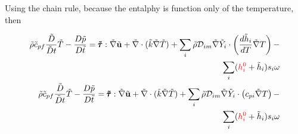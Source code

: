 \documentclass[preprint,12pt,authoryear]{elsarticle}
\begin{document}
Using the chain rule, because the entalphy is function only of the temperature, then 

\begin{equation}
\begin{split}
        \tilde{\rho}
        \tilde{c}_{pf}
        \frac{\tilde{D}}{\tilde{D} t}
        \tilde{T}
        -
        \frac{D \tilde{p}}{D\tilde{t}}
        =
        \pmb{\tilde{\tau}}:\tilde{\nabla} \tilde{\mathbf{u}} 
        + 
        \tilde{\nabla} \cdot (\tilde{k}\tilde{\nabla} \tilde{T})
        +
        \sum\limits_i 
        \tilde{\rho}
        \mathcal{D}_{im}
        \tilde{\nabla}
        \tilde{Y}_i     
        \cdot
        \left(
        \frac{d \tilde{h}_i}{ d T}
        \tilde{\nabla}T 
        \right)
        	-
\\
        \sum\limits_i
        ({\color{red} h_i^0} + \tilde{h}_i)
        s_i	
        \omega
\\
        \tilde{\rho}
        \tilde{c}_{pf}
        \frac{\tilde{D}}{\tilde{D} t}
        \tilde{T}
        -
        \frac{D \tilde{p}}{D\tilde{t}}
        =
        \pmb{\tilde{\tau}}:\tilde{\nabla} \tilde{\mathbf{u}} 
        + 
        \tilde{\nabla} \cdot (\tilde{k}\tilde{\nabla} \tilde{T})
        +
        \sum\limits_i 
        \tilde{\rho}
        \mathcal{D}_{im}
        \tilde{\nabla}
        \tilde{Y}_i     
        \cdot
        \left(
        c_{pi}
        \tilde{\nabla}T 
        \right)
	-
\\	
        \sum\limits_i
        ({\color{red} h_i^0} + \tilde{h}_i)
        s_i	
        \omega
%      
\end{split}
\end{equation}
\end{document}
